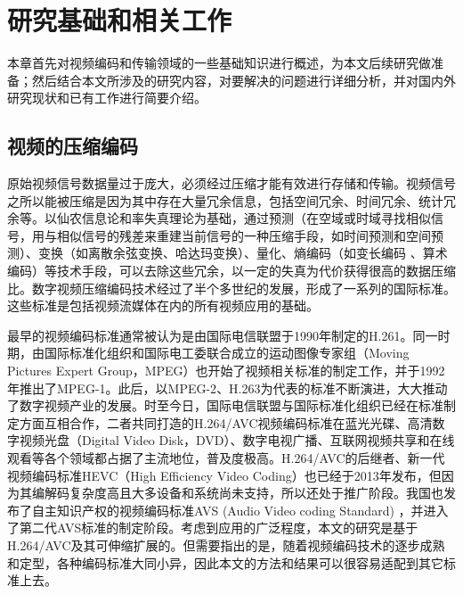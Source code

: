 \chapter{研究基础和相关工作}

本章首先对视频编码和传输领域的一些基础知识进行概述，为本文后续研究做准备；然后结合本文所涉及的研究内容，对要解决的问题进行详细分析，并对国内外研究现状和已有工作进行简要介绍。

\section{视频的压缩编码}

原始视频信号数据量过于庞大，必须经过压缩才能有效进行存储和传输。视频信号之所以能被压缩是因为其中存在大量冗余信息，包括空间冗余、时间冗余、统计冗余等\supercite{Gao-book-2010}。以仙农信息论\supercite{Shannon-1948}和率失真理论\supercite{Berger-book-1984}为基础，通过预测（在空域或时域寻找相似信号，用与相似信号的残差来重建当前信号的一种压缩手段，如时间预测和空间预测）、变换（如离散余弦变换\supercite{Rao-1990}、哈达玛变换\supercite{Pratt-1969}）、量化\supercite{Gray-TIT1997}、熵编码（如变长编码\supercite{Huffman-1952} 、算术编码\supercite{Rissanen-1979}）等技术手段，可以去除这些冗余，以一定的失真为代价获得很高的数据压缩比。数字视频压缩编码技术经过了半个多世纪的发展，形成了一系列的国际标准。这些标准是包括视频流媒体在内的所有视频应用的基础。

最早的视频编码标准通常被认为是由国际电信联盟于1990年制定的H.261\supercite{H.261}。同一时期，由国际标准化组织和国际电工委联合成立的运动图像专家组（Moving Pictures Expert Group，MPEG）也开始了视频相关标准的制定工作，并于1992年推出了MPEG-1\supercite{MPEG1}。此后，以MPEG-2\supercite{MPEG2}、H.263\supercite{H.263}为代表的标准不断演进，大大推动了数字视频产业的发展。时至今日，国际电信联盟与国际标准化组织已经在标准制定方面互相合作，二者共同打造的H.264/AVC视频编码标准在蓝光光碟、高清数字视频光盘（Digital Video Disk，DVD）、数字电视广播、互联网视频共享和在线观看等各个领域都占据了主流地位，普及度极高。H.264/AVC的后继者、新一代视频编码标准HEVC（High Efficiency Video Coding）\supercite{HEVCOverview}也已经于2013年发布，但因为其编解码复杂度高\supercite{Bossen-TCSVT2012}且大多设备和系统尚未支持，所以还处于推广阶段\supercite{JCTVC-H0693, Chavarrias-TCE2013, Duan2014}。我国也发布了自主知识产权的视频编码标准AVS (Audio Video coding Standard) \supercite{AVS}，并进入了第二代AVS标准的制定阶段。考虑到应用的广泛程度，本文的研究是基于H.264/AVC及其可伸缩扩展的。但需要指出的是，随着视频编码技术的逐步成熟和定型，各种编码标准大同小异，因此本文的方法和结果可以很容易适配到其它标准上去。

